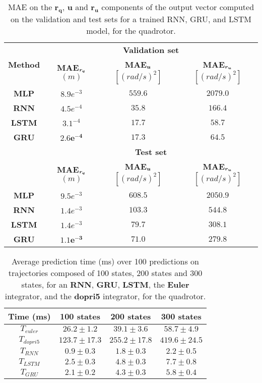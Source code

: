 \begin{table}[t]
\centering
\begin{tabular}{ | c | c  c  c | }
\hline
    \multirow{2}{*}{\textbf{Method}} & \multicolumn{3}{c|}{\textbf{Validation set}} \\ \cline{2-4}
    & \textbf{MAE$_{\boldsymbol{r_q}}$} $(m)$  & \textbf{MAE$_{\boldsymbol{u}}$} $[(rad/s)^2]$ & \textbf{MAE$_{\boldsymbol{r_u}}$} $[(rad/s)^2]$ \\ \hline
{\textbf{MLP}} & $8.9e^{-3}$ & $559.6$ & $2079.0$ \\ 
{\textbf{RNN}} & $4.5e^{-4}$ & $35.8$ & $166.4$ \\ 
{\textbf{LSTM}} & $3.1^{-4}$ & $17.7$ & $\boldsymbol{58.7}$ \\ 
{\textbf{GRU}} & $\boldsymbol{2.6e^{-4}}$ & $\boldsymbol{17.3}$ & $64.5$ \\ 
\hline
    & \multicolumn{3}{c|}{\textbf{Test set}}\\ \cline{2-4}
    & \textbf{MAE$_{\boldsymbol{r_q}}$} $(m)$  & \textbf{MAE$_{\boldsymbol{u}}$} $[(rad/s)^2]$ & \textbf{MAE$_{\boldsymbol{r_u}}$} $[(rad/s)^2]$ \\ \hline
{\textbf{MLP}} & $9.5e^{-3}$ & $608.5$ & $2050.9$ \\ 
{\textbf{RNN}} &  $1.4e^{-3}$ & $103.3$ & $544.8$ \\ 
{\textbf{LSTM}} & $1.4e^{-3}$ & $79.7$ & $308.1$ \\ 
{\textbf{GRU}} & $\boldsymbol{1.1e^{-3}}$ & $\boldsymbol{71.0}$ & $\boldsymbol{279.8}$ \\ 
\hline
    
\end{tabular}
\caption{
MAE on the $\boldsymbol{r_q}$, $\boldsymbol{u}$ and $\boldsymbol{r_u}$ components of the output vector computed on the validation and test sets for a trained RNN, GRU, and LSTM model, for the quadrotor.}
    \label{tab:NN_results_table_Q}
\end{table}

\begin{table}[t]
\centering
\begin{tabular}{ | c | c  c  c | }
\hline
    \textbf{Time (ms)} & 100 states  & 200 states & 300 states \\ \hline
    $T_{euler}$ & $26.2 \pm 1.2$ & $39.1 \pm 3.6$ & $58.7 \pm 4.9$ \\ 
$T_{dopri5}$ & $123.7 \pm 17.3$ & $255.2 \pm 17.8$ & $419.6 \pm 24.5$ \\ 
$T_{RNN}$ & $\boldsymbol{0.9} \pm 0.3$ & $\boldsymbol{1.8} \pm 0.3$ & $\boldsymbol{2.2} \pm 0.5$ \\ 
$T_{LSTM}$ & $2.5 \pm 0.3$ & $4.8 \pm 0.3$ & $7.7 \pm 0.8$ \\ 
$T_{GRU}$ & $2.1 \pm 0.2$ & $4.3 \pm 0.3$ & $5.8 \pm 0.4$  \\ \hline
\end{tabular}
\caption{
Average prediction time (ms) over 100 predictions on trajectories composed of 100 states, 200 states and 300 states, for an \textbf{RNN}, \textbf{GRU}, \textbf{LSTM}, the \textbf{Euler} integrator, and the \textbf{dopri5} integrator, for the quadrotor.}
    \label{tab:timepred}
\end{table}